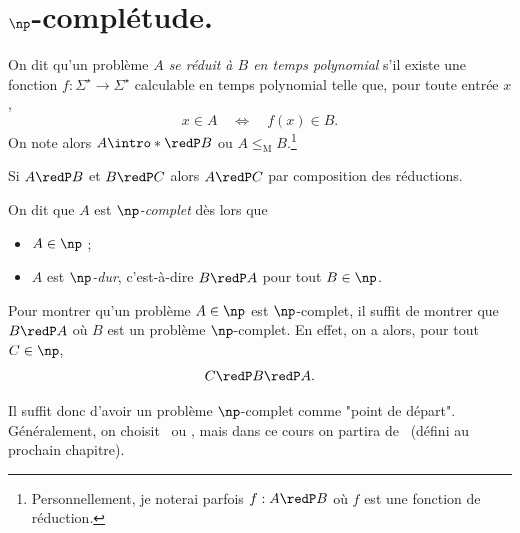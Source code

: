 \documentclass[./main]{subfiles}
\begin{document}
  \section{$\np$-complétude.}

  \begin{defn}
    On dit qu'un problème \textit{$A$ se réduit à $B$ en temps polynomial} s'il existe une fonction $f : \Sigma^\star \to \Sigma^\star$ calculable en temps polynomial telle que, pour toute entrée $x$,
    \[
    x \in A \quad \iff \quad f(x) \in B
    .\]
    On note alors $A \intro*\redP B$ ou $A \le_\mathrm{M} B$.\footnote{Personnellement, je noterai parfois $f : A \redP B$ où $f$ est une fonction de réduction.}
  \end{defn}

  \begin{rmk}
    Si $A \redP B$ et $B \redP C$ alors $A \redP C$ par composition des réductions.
  \end{rmk}

  \begin{defn}[$\np$-complétude]
    On dit que $A$ est \textit{$\np$-complet} dès lors que
    \begin{itemize}
      \item $A \in \np$ ;
      \item $A$ est \textit{$\np$-dur}, c'est-à-dire $B \redP A$ pour tout $B \in \np$.
    \end{itemize}
  \end{defn}

  \begin{rmk}
    Pour montrer qu'un problème $A \in \np$ est $\np$-complet, il suffit de montrer que $B \redP A$ où $B$ est un problème $\np$-complet.
    En effet, on a alors, pour tout $C \in \np$,
    \[
    C \redP B \redP A
    .\] 

    Il suffit donc d'avoir un problème $\np$-complet comme "point de départ".
    Généralement, on choisit \pbSat\ ou \pbThreeSat, mais dans ce cours on partira de \pbCircuitSat\ (défini au prochain chapitre).
  \end{rmk}

  \showSat

  \showThreeSat
\end{document}
